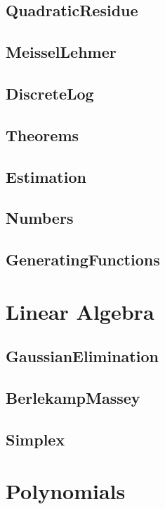 \subsection{QuadraticResidue}

\subsection{MeisselLehmer}

\subsection{DiscreteLog}

\subsection{Theorems}

\subsection{Estimation}

\subsection{Numbers}

\subsection{GeneratingFunctions}

\section{Linear Algebra}
\subsection{GaussianElimination}

\subsection{BerlekampMassey}

\subsection{Simplex}


\section{Polynomials}
